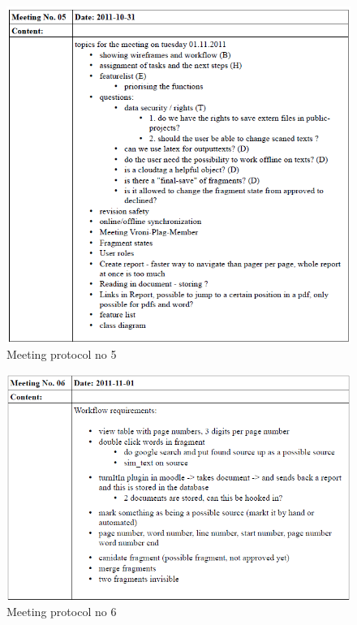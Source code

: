 \begin{appendix}
\begin{figure}
  \centering
    \includegraphics[width=\textwidth]{images/a_meetings/meeting_05.png}
  \caption{Meeting protocol no 5}
  \label{fig:meeting protocol no. 5}
\end{figure}

\begin{figure}
  \centering
    \includegraphics[width=\textwidth]{images/a_meetings/meeting_06.png}
  \caption{Meeting protocol no 6}
  \label{fig:meeting protocol no. 6}
\end{figure}


\end{appendix}
